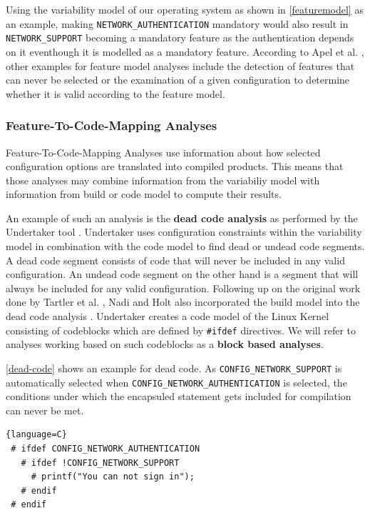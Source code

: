 \documentclass[a4paper]{article}
\begin{document}
Using the variability model of our operating system as shown in \autoref{featuremodel} as an example, making \texttt{NETWORK\_AUTHENTICATION} mandatory would also result in \texttt{NETWORK\_SUPPORT} becoming a mandatory feature as the authentication depends on it eventhough it is modelled as a mandatory feature.  According to Apel et al. \cite{Apel:2013:FSP:2541773}, other examples for feature model analyses include the detection of features that can never be selected or the examination of a given configuration to determine whether it is valid according to the feature model.

\subsubsection{Feature-To-Code-Mapping Analyses}\label{feature-code-mapping}

Feature-To-Code-Mapping Analyses use information about how selected configuration options are translated into compiled products. This means that those analyses may combine information from the variabiliy model with information from build or code model to compute their results.

An example of such an analysis is the \textbf{dead code analysis} as performed by the Undertaker tool \cite{Tartler:2011:FCC:1966445.1966451}. Undertaker uses configuration constraints within the variability model in combination with the code model to find dead or undead code segments. A dead code segment consists of code that will never be included in any valid configuration. An undead code segment on the other hand is a segment that will always be included for any valid configuration. Following up on the original work done by  Tartler et al. \cite{Tartler:2011:FCC:1966445.1966451}, Nadi and Holt also incorporated the build model into the dead code analysis \cite{mining-kbuild}. Undertaker creates a code model of the Linux Kernel consisting of codeblocks which are defined by \texttt{\#ifdef} directives. We will refer to analyses working based on such codeblocks as a \textbf{block based analyses}.

\autoref{dead-code} shows an example for dead code. As \texttt{CONFIG\_NETWORK\_SUPPORT} is automatically selected when \texttt{CONFIG\_NETWORK\_AUTHENTICATION} is selected, the conditions under which the encapsuled statement gets included for compilation can never be met. 

\begin{lstlisting}[caption=Dead Code, label=dead-code]{language=C}
 # ifdef CONFIG_NETWORK_AUTHENTICATION
   # ifdef !CONFIG_NETWORK_SUPPORT
     # printf("You can not sign in");
   # endif
 # endif
\end{lstlisting}
\end{document}

